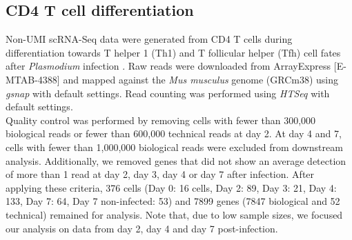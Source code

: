 \subsection{CD4\plus{} T cell differentiation} \label{seq::data_cd4diff}

Non-UMI scRNA-Seq data were generated from CD4\plus{} T cells during differentiation towards T helper 1 (Th1) and T follicular helper (Tfh) cell fates after \emph{Plasmodium} infection \citep{Lonnberg2017}. Raw reads were downloaded from ArrayExpress [E-MTAB-4388] and mapped against the \emph{Mus musculus} genome (GRCm38) using \emph{gsnap} \citep{Wu2010a} with default settings. Read counting was performed using \emph{HTSeq} \citep{Anders2014} with default settings. \\

Quality control was performed by removing cells with fewer than 300,000 biological reads or fewer than 600,000 technical reads at day 2. At day 4 and 7, cells with fewer than 1,000,000 biological reads were excluded from downstream analysis. Additionally, we removed genes that did not show an average detection of more than 1 read at day 2, day 3, day 4 or day 7 after infection. After applying these criteria, 376 cells (Day 0: 16 cells, Day 2: 89, Day 3: 21, Day 4: 133, Day 7: 64, Day 7 non-infected: 53) and 7899 genes (7847 biological and 52 technical) remained for analysis. Note that, due to low sample sizes, we focused our analysis on data from day 2, day 4 and day 7 post-infection.

